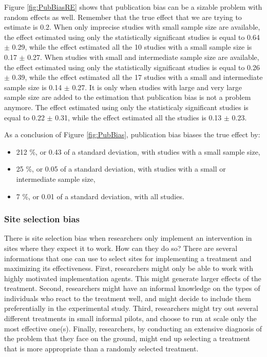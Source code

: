\documentclass[
]{book}
\providecommand{\tightlist}{%
  \setlength{\itemsep}{0pt}\setlength{\parskip}{0pt}}
\theoremstyle{definition}
\theoremstyle{definition}
\theoremstyle{definition}
\theoremstyle{definition}
\theoremstyle{remark}
\begin{document}
Figure \ref{fig:PubBiasRE} shows that publication bias can be a sizable problem with random effects as well.
Remember that the true effect that we are trying to estimate is 0.2.
When only imprecise studies with small sample size are available, the effect estimated using only the statistically significant studies is equal to 0.64 \(\pm\) 0.29, while the effect estimated all the 10 studies with a small sample size is 0.17 \(\pm\) 0.27.
When studies with small and intermediate sample size are available, the effect estimated using only the statistically significant studies is equal to 0.26 \(\pm\) 0.39, while the effect estimated all the 17 studies with a small and intermediate sample size is 0.14 \(\pm\) 0.27.
It is only when studies with large and very large sample size are added to the estimation that publication bias is not a problem anymore.
The effect estimated using only the statisticaly significant studies is equal to 0.22 \(\pm\) 0.31, while the effect estimated all the studies is 0.13 \(\pm\) 0.23.

As a conclusion of Figure \ref{fig:PubBias}, publication bias biases the true effect by:

\begin{itemize}
\tightlist
\item
  212 \%, or 0.43 of a standard deviation, with studies with a small sample size,
\item
  25 \%, or 0.05 of a standard deviation, with studies with a small or intermediate sample size,
\item
  7 \%, or 0.01 of a standard deviation, with all studies.
\end{itemize}

\hypertarget{site-selection-bias-1}{%
\subsubsection{Site selection bias}\label{site-selection-bias-1}}

There is site selection bias when researchers only implement an intervention in sites where they expect it to work.
How can they do so?
There are several informations that one can use to select sites for implementing a treatment and maximizing its effectiveness.
First, researchers might only be able to work with highly motivated implementation agents.
This might generate larger effects of the treatment.
Second, researchers might have an informal knowledge on the types of individuals who react to the treatment well, and might decide to include them preferentially in the experimental study.
Third, researchers might try out several different treatments in small informal pilots, and choose to run at scale only the most effective one(s).
Finally, researchers, by conducting an extensive diagnosis of the problem that they face on the ground, might end up selecting a treatment that is more appropriate than a randomly selected treatment.
\end{document}
